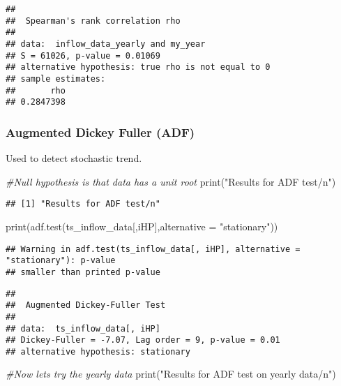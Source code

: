 \documentclass[
]{article}
\newenvironment{Shaded}{\begin{snugshade}}{\end{snugshade}}
\newcommand{\AttributeTok}[1]{\textcolor[rgb]{0.77,0.63,0.00}{#1}}
\newcommand{\CommentTok}[1]{\textcolor[rgb]{0.56,0.35,0.01}{\textit{#1}}}
\newcommand{\FunctionTok}[1]{\textcolor[rgb]{0.00,0.00,0.00}{#1}}
\newcommand{\NormalTok}[1]{#1}
\newcommand{\StringTok}[1]{\textcolor[rgb]{0.31,0.60,0.02}{#1}}
\begin{document}
\begin{verbatim}
## 
##  Spearman's rank correlation rho
## 
## data:  inflow_data_yearly and my_year
## S = 61026, p-value = 0.01069
## alternative hypothesis: true rho is not equal to 0
## sample estimates:
##       rho 
## 0.2847398
\end{verbatim}

\hypertarget{augmented-dickey-fuller-adf}{%
\subsubsection{Augmented Dickey Fuller
(ADF)}\label{augmented-dickey-fuller-adf}}

Used to detect stochastic trend.

\begin{Shaded}
\begin{Highlighting}[]
\CommentTok{\#Null hypothesis is that data has a unit root}
\FunctionTok{print}\NormalTok{(}\StringTok{"Results for ADF test/n"}\NormalTok{)}
\end{Highlighting}
\end{Shaded}

\begin{verbatim}
## [1] "Results for ADF test/n"
\end{verbatim}

\begin{Shaded}
\begin{Highlighting}[]
\FunctionTok{print}\NormalTok{(}\FunctionTok{adf.test}\NormalTok{(ts\_inflow\_data[,iHP],}\AttributeTok{alternative =} \StringTok{"stationary"}\NormalTok{))}
\end{Highlighting}
\end{Shaded}

\begin{verbatim}
## Warning in adf.test(ts_inflow_data[, iHP], alternative = "stationary"): p-value
## smaller than printed p-value
\end{verbatim}

\begin{verbatim}
## 
##  Augmented Dickey-Fuller Test
## 
## data:  ts_inflow_data[, iHP]
## Dickey-Fuller = -7.07, Lag order = 9, p-value = 0.01
## alternative hypothesis: stationary
\end{verbatim}

\begin{Shaded}
\begin{Highlighting}[]
\CommentTok{\#Now let\textquotesingle{}s try the yearly data}
\FunctionTok{print}\NormalTok{(}\StringTok{"Results for ADF test on yearly data/n"}\NormalTok{)}
\end{Highlighting}
\end{Shaded}
\end{document}
